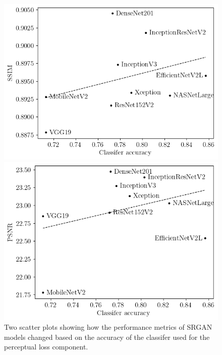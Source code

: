\begin{figure}
    \centering
    \begin{minipage}{0.5\textwidth}
        \centering
        \includegraphics[width=\textwidth]{./assets/ssim_accuracy_trend.png} %
    \end{minipage}\hfill
    \begin{minipage}{0.5\textwidth}
        \centering
        \includegraphics[width=\textwidth]{./assets/psnr_accuracy_trend.png} %
    \end{minipage}
    \caption{Two scatter plots showing how the performance metrics of SRGAN models changed based on the accuracy of the classifer used for the perceptual loss component.}
    \label{fig:performance_metric_vs_classifier_accuracy}
\end{figure}

